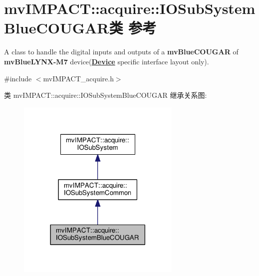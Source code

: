 \hypertarget{classmv_i_m_p_a_c_t_1_1acquire_1_1_i_o_sub_system_blue_c_o_u_g_a_r}{\section{mv\+I\+M\+P\+A\+C\+T\+:\+:acquire\+:\+:I\+O\+Sub\+System\+Blue\+C\+O\+U\+G\+A\+R类 参考}
\label{classmv_i_m_p_a_c_t_1_1acquire_1_1_i_o_sub_system_blue_c_o_u_g_a_r}
}


A class to handle the digital inputs and outputs of a {\bfseries mv\+Blue\+C\+O\+U\+G\+A\+R} of {\bfseries mv\+Blue\+L\+Y\+N\+X-\/\+M7} device({\bfseries \hyperlink{classmv_i_m_p_a_c_t_1_1acquire_1_1_device}{Device}} specific interface layout only).  




{\ttfamily \#include $<$mv\+I\+M\+P\+A\+C\+T\+\_\+acquire.\+h$>$}



类 mv\+I\+M\+P\+A\+C\+T\+:\+:acquire\+:\+:I\+O\+Sub\+System\+Blue\+C\+O\+U\+G\+A\+R 继承关系图\+:
\nopagebreak
\begin{figure}[H]
\begin{center}
\leavevmode
\includegraphics[width=222pt]{classmv_i_m_p_a_c_t_1_1acquire_1_1_i_o_sub_system_blue_c_o_u_g_a_r__inherit__graph}
\end{center}
\end{figure}


